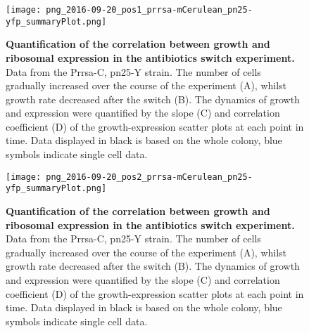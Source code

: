 \begin{figure}
    \begin{minipage}[c]{0.7\textwidth}
        \texttt{[image: png\_2016-09-20\_pos1\_prrsa-mCerulean\_pn25-yfp\_summaryPlot.png]}
    \end{minipage}\hfill
    \begin{minipage}[c]{0.3\textwidth}
        \caption{ 
            \textbf{Quantification of the correlation between growth and ribosomal expression in the antibiotics switch experiment.}
            Data from the Prrsa-C, pn25-Y strain. The number of cells gradually increased over the course of the experiment (A), whilst growth rate decreased after the switch (B).
            The dynamics of growth and expression were quantified by the slope (C) and correlation coefficient (D) of the growth-expression scatter plots at each point in time.
            Data displayed in black is based on the whole colony, blue symbols indicate single cell data.
        }
        \label{fig:ribo:switch3}
    \end{minipage}
\end{figure}
\begin{figure}
    \begin{minipage}[c]{0.7\textwidth}
        \texttt{[image: png\_2016-09-20\_pos2\_prrsa-mCerulean\_pn25-yfp\_summaryPlot.png]}
    \end{minipage}\hfill
    \begin{minipage}[c]{0.3\textwidth}
        \caption{ 
            \textbf{Quantification of the correlation between growth and ribosomal expression in the antibiotics switch experiment.}
            Data from the Prrsa-C, pn25-Y strain. The number of cells gradually increased over the course of the experiment (A), whilst growth rate decreased after the switch (B).
            The dynamics of growth and expression were quantified by the slope (C) and correlation coefficient (D) of the growth-expression scatter plots at each point in time.
            Data displayed in black is based on the whole colony, blue symbols indicate single cell data.
        }
        \label{fig:ribo:switch4}
    \end{minipage}
\end{figure}
